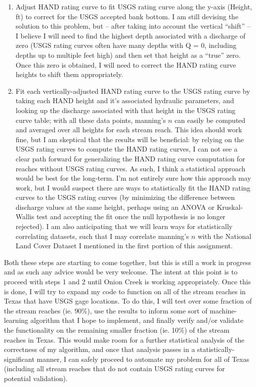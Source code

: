 \documentclass[11pt]{article}
\begin{document}
\begin{enumerate}
  \item Adjust HAND rating curve to fit USGS rating curve along the y-axis (Height, ft) to correct for the USGS accepted bank bottom. I am still devising the solution to this problem, but -- after taking into account the vertical ``shift'' -- I believe I will need to find the highest depth associated with a discharge of zero (USGS rating curves often have many depths with Q = 0, including depths up to multiple feet high) and then set that height as a ``true'' zero. Once this zero is obtained, I will need to correct the HAND rating curve heights to shift them appropriately. 
  \vspace{1ex}
  \item Fit each vertically-adjusted HAND rating curve to the USGS rating curve by taking each HAND height and it's associated hydraulic parameters, and looking up the discharge associated with that height in the USGS rating curve table; with all these data points, manning's $n$ can easily be computed and averaged over all heights for each stream reach. This idea should work fine, but I am skeptical that the results will be beneficial: by relying on the USGS rating curves to compute the HAND rating curves, I can not see a clear path forward for generalizing the HAND rating curve computation for reaches without USGS rating curves. As such, I think a statistical approach would be best for the long-term. I'm not entirely sure how this approach may work, but I would suspect there are ways to statistically fit the HAND rating curves to the USGS rating curves (by minimizing the difference between discharge values at the same height, perhaps using an ANOVA or Kruskal-Wallis test and accepting the fit once the null hypothesis is no longer rejected). I am also anticipating that we will learn ways for statistically correlating datasets, such that I may correlate manning's $n$ with the National Land Cover Dataset I mentioned in the first portion of this assignment. 
\end{enumerate}

Both these steps are starting to come together, but this is still a work in progress and as such any advice would be very welcome. The intent at this point is to proceed with steps 1 and 2 until Onion Creek is working appropriately. Once this is done, I will try to expand my code to function on all of the stream reaches in Texas that have USGS gage locations. To do this, I will test over some fraction of the stream reaches (ie. 90\%), use the results to inform some sort of machine-learning algorithm that I hope to implement, and finally verify and/or validate the functionality on the remaining smaller fraction (ie. 10\%) of the stream reaches in Texas. This would make room for a further statistical analysis of the correctness of my algorithm, and once that analysis passes in a statistically-significant manner, I can safely proceed to automate my problem for all of Texas (including all stream reaches that do not contain USGS rating curves for potential validation). \\

\clearpage


\end{document}
